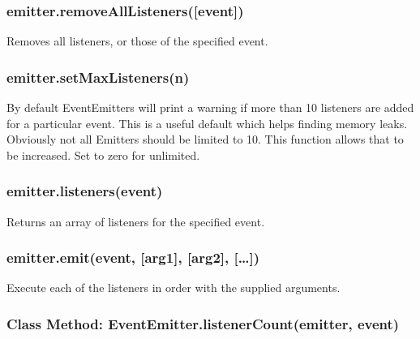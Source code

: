 \subsubsection{emitter.removeAllListeners({[}event{]})}

Removes all listeners, or those of the specified event.

\subsubsection{emitter.setMaxListeners(n)}

By default EventEmitters will print a warning if more than 10 listeners
are added for a particular event. This is a useful default which helps
finding memory leaks. Obviously not all Emitters should be limited to
10. This function allows that to be increased. Set to zero for
unlimited.

\subsubsection{emitter.listeners(event)}

Returns an array of listeners for the specified event.

\begin{Shaded}
\begin{Highlighting}[]
\NormalTok{(}\NormalTok{, } 
  \NormalTok{(}\NormalTok{);}
\NormalTok{\});}
\NormalTok{(}\NormalTok{(}\NormalTok{(}\NormalTok{))); }\CommentTok{// [ [Function] ]}
\end{Highlighting}
\end{Shaded}

\subsubsection{emitter.emit(event, {[}arg1{]}, {[}arg2{]},
{[}\ldots{}{]})}

Execute each of the listeners in order with the supplied arguments.

\subsubsection{Class Method: EventEmitter.listenerCount(emitter, event)}

